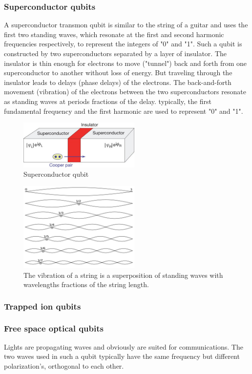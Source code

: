 \documentclass{book}
\begin{document}
\subsubsection{Superconductor qubits}
A superconductor transmon qubit is similar to the string of a guitar and uses the first two standing waves, which resonate at the first and second harmonic frequencies respectively, to represent the integers of "0" and "1". Such a qubit is constructed by two superconductors separated by a layer of insulator. The insulator is thin enough for electrons to move ("tunnel") back and forth from one superconductor to another without loss of energy. But traveling through the insulator leads to delays (phase delays) of the electrons. The back-and-forth movement (vibration) of the electrons between the two superconductors resonate as standing waves at periods fractions of the delay. typically, the first fundamental frequency and the first harmonic are used to represent "0" and "1".
\begin{figure}[ht]
\includegraphics[width=6cm]{supercQubit.jpg}
\caption{Superconductor qubit}
\label{Superconductor}
\end{figure}

\begin{figure}[ht]
\includegraphics[width=6cm]{overtones.png}
\caption{The vibration of a string is a superposition of standing waves with wavelengths fractions of the string length.}
\label{Overtones}
\end{figure}

\subsubsection{Trapped ion qubits}

\subsubsection{Free space optical qubits}
Lights are propagating waves and obviously are suited for communications. The two waves used in such a qubit typically have the same frequency but different polarization's, orthogonal to each other.
\end{document}
